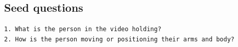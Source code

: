 \subsection*{Seed questions}
\begin{lstlisting}
1. What is the person in the video holding?
2. How is the person moving or positioning their arms and body?
\end{lstlisting}
